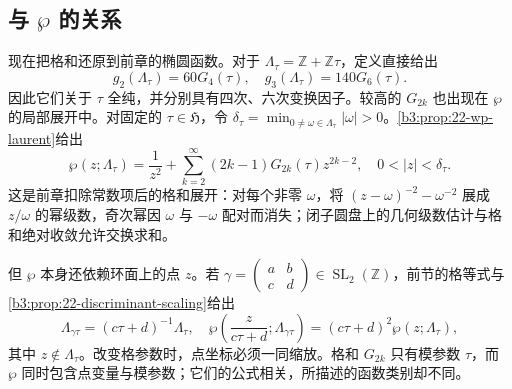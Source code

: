 \subsection{与 \texorpdfstring{\(\wp\)}{\AnalysisPdfWeierstrassP} 的关系}
\label{b3:subsec:230204}

现在把格和还原到前章的椭圆函数。对于 \(\Lambda_\tau=\mathbb Z+\mathbb Z\tau\)，定义直接给出
\begin{equation}\label{b3:eq:23-g-invariants}
 g_2(\Lambda_\tau)=60G_4(\tau),\quad
 g_3(\Lambda_\tau)=140G_6(\tau).
\end{equation}
因此它们关于 \(\tau\) 全纯，并分别具有四次、六次变换因子。较高的 \(G_{2k}\) 也出现在 \(\wp\) 的局部展开中。对固定的 \(\tau\in\mathfrak H\)，令 \(\delta_\tau=\min_{0\ne\omega\in\Lambda_\tau}|\omega|>0\)。\cref{b3:prop:22-wp-laurent}给出
\[
 \wp(z;\Lambda_\tau)=\frac1{z^2}
 +\sum_{k=2}^{\infty}(2k-1)G_{2k}(\tau)z^{2k-2},
 \quad 0<|z|<\delta_\tau.
\]
这是前章扣除常数项后的格和展开：对每个非零 \(\omega\)，将 \((z-\omega)^{-2}-\omega^{-2}\) 展成 \(z/\omega\) 的幂级数，奇次幂因 \(\omega\) 与 \(-\omega\) 配对而消失；闭子圆盘上的几何级数估计与格和绝对收敛允许交换求和。

\ProseParagraphBreak

但 \(\wp\) 本身还依赖环面上的点 \(z\)。若 \(\gamma=\left(\begin{smallmatrix}a&b\\c&d\end{smallmatrix}\right)\in\operatorname{SL}_2(\mathbb Z)\)，前节的格等式与\cref{b3:prop:22-discriminant-scaling}给出
\[
 \Lambda_{\gamma\tau}=(c\tau+d)^{-1}\Lambda_\tau,
 \quad
 \wp\left(\frac{z}{c\tau+d};\Lambda_{\gamma\tau}\right)
 =(c\tau+d)^2\wp(z;\Lambda_\tau),
\]
其中 \(z\notin\Lambda_\tau\)。改变格参数时，点坐标必须一同缩放。格和 \(G_{2k}\) 只有模参数 \(\tau\)，而 \(\wp\) 同时包含点变量与模参数；它们的公式相关，所描述的函数类别却不同。
